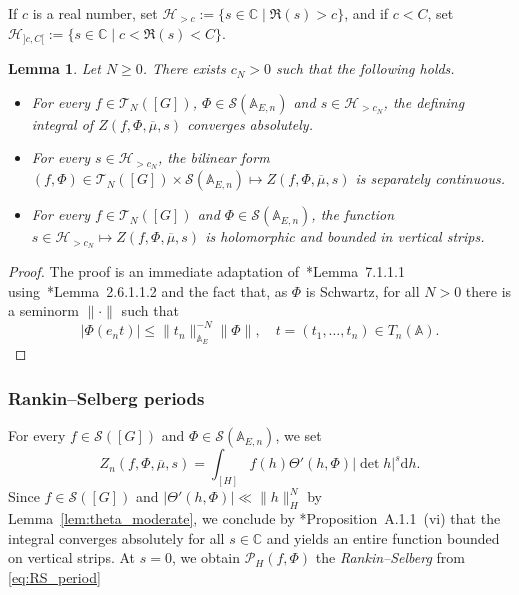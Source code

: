 \documentclass[letterpaper,11pt]{amsart}
\newcommand{\bA}{\mathbb{A}}
\newcommand{\C}{\mathbb{C}}
\newcommand{\cP}{\mathcal{P}}
\newcommand{\cS}{\mathcal{S}}
\newcommand{\rd}{\mathrm{d}}
\newcommand{\<}{\negthickspace}
\providecommand{\aabs}[1]{\lVert#1\rVert}
\newcommand{\valP}[1]{\left|#1\right|}
\theoremstyle{definition}
\theoremstyle{plain}
\newtheorem{lemma}[definition]{Lemma}
\theoremstyle{remark}
\numberwithin{equation}{section}
\begin{document}
If $c$ is a real number, set $\mathcal{H}_{>c} := \{ s
\in \C \; | \; \Re(s)>c \}$, and if $c<C$, set $\mathcal{H}_{]c,C[} := \{ s
\in \C \; | \; c<\Re(s)<C \}$.


\begin{lemma}   \label{lem:convTau}
Let $N \geq 0$. There exists $c_N>0$ such that the following holds.
\begin{itemize}
    \item For every $f \in \mathcal{T}_N([G])$, $\Phi \in \cS(\bA_{E,n})$
        and $s \in \mathcal{H}_{>c_N}$, the defining integral of
        $Z(f,\Phi,\overline{\mu}, s)$ converges absolutely.

    \item For every $s \in \mathcal{H}_{>c_N}$, the bilinear form $(f,\Phi)
        \in \mathcal{T}_N([G]) \times \cS(\bA_{E,n})\mapsto
        Z(f,\Phi,\overline{\mu}, s)$ is separately continuous.

    \item For every $f \in \mathcal{T}_N([G])$ and $\Phi \in
        \cS(\bA_{E,n})$, the function $s \in \mathcal{H}_{>c_N} \mapsto
        Z(f,\Phi,\overline{\mu}, s)$ is holomorphic and bounded
        in vertical strips.
\end{itemize}
\end{lemma}

\begin{proof}
The proof is an immediate adaptation of~\cite{BPCZ}*{Lemma~7.1.1.1} using~\cite{BPCZ}*{Lemma~2.6.1.1.2} and the fact that, as $\Phi$ is Schwartz, for all $N>0$ there is a seminorm $\aabs{\cdot}$ such that
    \[
    \valP{\Phi(e_n t)} \leq \aabs{t_n}^{-N}_{\bA_E} \aabs{\Phi}, \quad t=(t_1, \hdots, t_n) \in T_n(\bA).
    \]
\end{proof}

\subsubsection{Rankin--Selberg periods}
\label{subsec:RS_FJ}

For every $f \in \cS([G])$ and $\Phi \in \cS(\bA_{E,n})$, we set
    \begin{equation}    \label{eq:Zn}
    Z_{n}(f,\Phi, \overline{\mu}, s) = \int_{[H]} f(h)
    \Theta'(h, \Phi)
    \valP{\det h}^{s} \rd h.
    \end{equation}
Since $f \in \cS([G])$ and $\valP{\Theta'(h, \Phi)} \ll \aabs{h}_H^{N}$ by Lemma~\ref{lem:theta_moderate}, we conclude by \cite{BP}*{Proposition~A.1.1~(vi)} that the
integral converges absolutely for all $s \in \C$ and yields an entire
function bounded on vertical strips. At $s=0$, we obtain $\cP_{H}(f,\Phi)$ the \emph{Rankin--Selberg} from \eqref{eq:RS_period}
\end{document}
